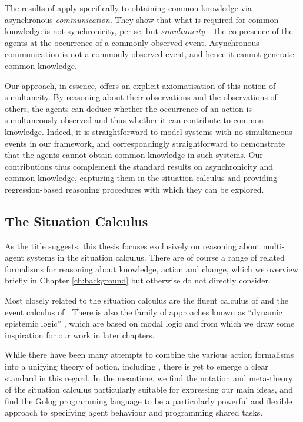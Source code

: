 The results of \citep{halpern90knowledge_distrib} apply specifically
to obtaining common knowledge via asynchronous \emph{communication}.
They show that what is required for common knowledge is not synchronicity,
per se, but \emph{simultaneity} -- the co-presence of the agents at
the occurrence of a commonly-observed event. Asynchronous communication
is not a commonly-observed event, and hence it cannot generate common
knowledge.

Our approach, in essence, offers an explicit axiomatisation of this
notion of simultaneity. By reasoning about their observations and
the observations of others, the agents can deduce whether the occurrence
of an action is simultaneously observed and thus whether it can contribute
to common knowledge. Indeed, it is straightforward to model systems
with no simultaneous events in our framework, and correspondingly
straightforward to demonstrate that the agents cannot obtain common
knowledge in such systems. Our contributions thus complement the standard
results on asynchronicity and common knowledge, capturing them in
the situation calculus and providing regression-based reasoning procedures
with which they can be explored.


\subsection{The Situation Calculus}

As the title suggests, this thesis focuses exclusively on reasoning
about multi-agent systems in the situation calculus. There are of
course a range of related formalisms for reasoning about knowledge,
action and change, which we overview briefly in Chapter \ref{ch:background}
but otherwise do not directly consider.

Most closely related to the situation calculus are the fluent calculus
of \citet{thielscher98fluent_calculus} and the event calculus of
\citet{kowalski86event_calculus}. There is also the family of approaches
known as {}``dynamic epistemic logic'' \citep{baltag98pa_ck,vanBenthem06lcc,vanBentham06tree_of_knowledge},
which are based on modal logic and from which we draw some inspiration
for our work in later chapters.

While there have been many attempts to combine the various action
formalisms into a unifying theory of action, including \citep{belleghem95combine_sitcalc_evtcalc,kowalski97reconcile_sitcalc_evtcalc,thielscher06reconcile_sc_fc,thielscher07unifying_action_calculus},
there is yet to emerge a clear standard in this regard. In the meantime,
we find the notation and meta-theory of the situation calculus particularly
suitable for expressing our main ideas, and find the Golog programming
language to be a particularly powerful and flexible approach to specifying
agent behaviour and programming shared tasks.

